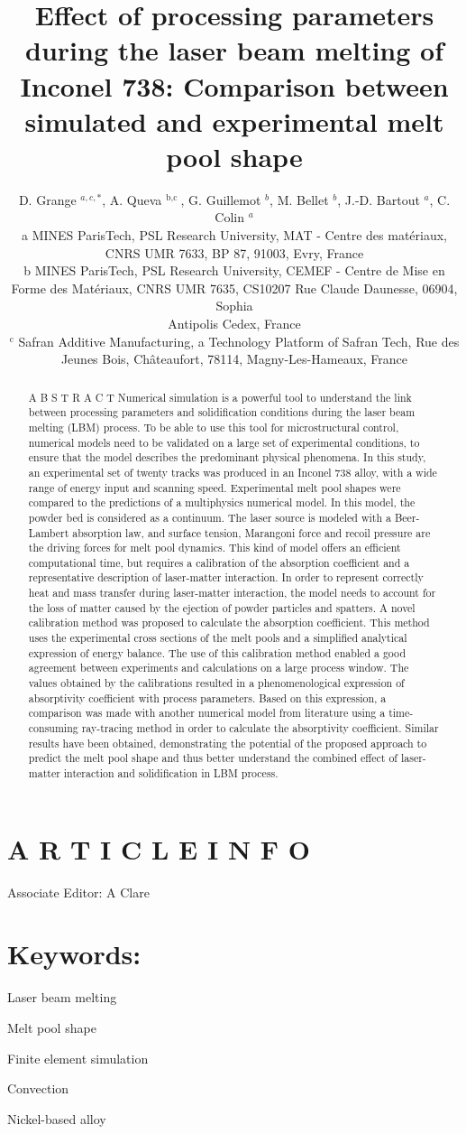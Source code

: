 \documentclass[10pt]{article}
\title{Effect of processing parameters during the laser beam melting of Inconel 738: Comparison between simulated and experimental melt pool shape }
\author{D. Grange ${ }^{a, c, *}$, A. Queva ${ }^{\text {b,c }}$, G. Guillemot ${ }^{b}$, M. Bellet ${ }^{b}$, J.-D. Bartout ${ }^{a}$, C. Colin ${ }^{a}$\\
a MINES ParisTech, PSL Research University, MAT - Centre des matériaux, CNRS UMR 7633, BP 87, 91003, Evry, France\\
b MINES ParisTech, PSL Research University, CEMEF - Centre de Mise en Forme des Matériaux, CNRS UMR 7635, CS10207 Rue Claude Daunesse, 06904, Sophia\\
Antipolis Cedex, France\\
${ }^{\mathrm{c}}$ Safran Additive Manufacturing, a Technology Platform of Safran Tech, Rue des Jeunes Bois, Châteaufort, 78114, Magny-Les-Hameaux, France}
\date{}
\begin{document}
\maketitle


\section*{A R T I C L E I N F O}
Associate Editor: A Clare

\section*{Keywords:}
Laser beam melting

Melt pool shape

Finite element simulation

Convection

Nickel-based alloy

\begin{abstract}
A B S T R A C T Numerical simulation is a powerful tool to understand the link between processing parameters and solidification conditions during the laser beam melting (LBM) process. To be able to use this tool for microstructural control, numerical models need to be validated on a large set of experimental conditions, to ensure that the model describes the predominant physical phenomena. In this study, an experimental set of twenty tracks was produced in an Inconel 738 alloy, with a wide range of energy input and scanning speed. Experimental melt pool shapes were compared to the predictions of a multiphysics numerical model. In this model, the powder bed is considered as a continuum. The laser source is modeled with a Beer-Lambert absorption law, and surface tension, Marangoni force and recoil pressure are the driving forces for melt pool dynamics. This kind of model offers an efficient computational time, but requires a calibration of the absorption coefficient and a representative description of laser-matter interaction. In order to represent correctly heat and mass transfer during laser-matter interaction, the model needs to account for the loss of matter caused by the ejection of powder particles and spatters. A novel calibration method was proposed to calculate the absorption coefficient. This method uses the experimental cross sections of the melt pools and a simplified analytical expression of energy balance. The use of this calibration method enabled a good agreement between experiments and calculations on a large process window. The values obtained by the calibrations resulted in a phenomenological expression of absorptivity coefficient with process parameters. Based on this expression, a comparison was made with another numerical model from literature using a time-consuming ray-tracing method in order to calculate the absorptivity coefficient. Similar results have been obtained, demonstrating the potential of the proposed approach to predict the melt pool shape and thus better understand the combined effect of laser-matter interaction and solidification in LBM process.
\end{abstract}
\end{document}
